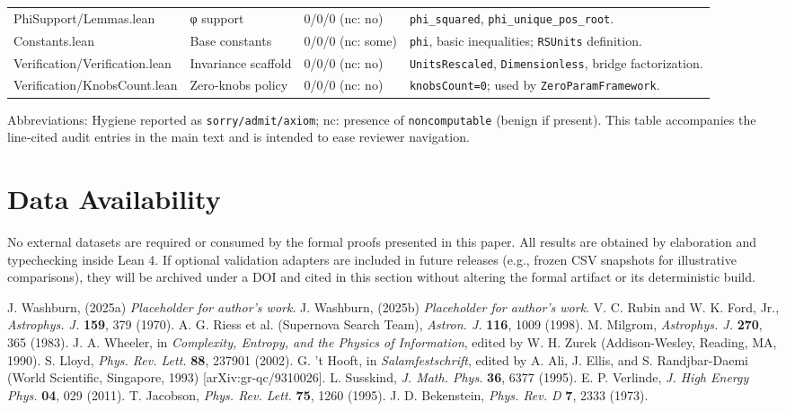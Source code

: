 \documentclass{article}
\begin{document}
\begin{center}
\begin{tabular}{lllp{6.8cm}}
PhiSupport/Lemmas.lean & φ support & 0/0/0 (nc: no) & \texttt{phi\_squared}, \texttt{phi\_unique\_pos\_root}. \\
Constants.lean & Base constants & 0/0/0 (nc: some) & \texttt{phi}, basic inequalities; \texttt{RSUnits} definition. \\
Verification/Verification.lean & Invariance scaffold & 0/0/0 (nc: no) & \texttt{UnitsRescaled}, \texttt{Dimensionless}, bridge factorization. \\
Verification/KnobsCount.lean & Zero‑knobs policy & 0/0/0 (nc: no) & \texttt{knobsCount=0}; used by \texttt{ZeroParamFramework}. \\
\hline
\end{tabular}
\end{center}

Abbreviations: Hygiene reported as \texttt{sorry/admit/axiom}; nc: presence of \texttt{noncomputable} (benign if present). This table accompanies the line‑cited audit entries in the main text and is intended to ease reviewer navigation.

\section{Data Availability}
No external datasets are required or consumed by the formal proofs presented in this paper. All results are obtained by elaboration and typechecking inside Lean 4. If optional validation adapters are included in future releases (e.g., frozen CSV snapshots for illustrative comparisons), they will be archived under a DOI and cited in this section without altering the formal artifact or its deterministic build.

\begin{thebibliography}{99}
 J. Washburn, (2025a) \textit{Placeholder for author's work}.
 J. Washburn, (2025b) \textit{Placeholder for author's work}.
 V. C. Rubin and W. K. Ford, Jr., \textit{Astrophys. J.} \textbf{159}, 379 (1970).
 A. G. Riess et al. (Supernova Search Team), \textit{Astron. J.} \textbf{116}, 1009 (1998).
 M. Milgrom, \textit{Astrophys. J.} \textbf{270}, 365 (1983).
 J. A. Wheeler, in \textit{Complexity, Entropy, and the Physics of Information}, edited by W. H. Zurek (Addison-Wesley, Reading, MA, 1990).
 S. Lloyd, \textit{Phys. Rev. Lett.} \textbf{88}, 237901 (2002).
 G. 't Hooft, in \textit{Salamfestschrift}, edited by A. Ali, J. Ellis, and S. Randjbar-Daemi (World Scientific, Singapore, 1993) [arXiv:gr-qc/9310026].
 L. Susskind, \textit{J. Math. Phys.} \textbf{36}, 6377 (1995).
 E. P. Verlinde, \textit{J. High Energy Phys.} \textbf{04}, 029 (2011).
 T. Jacobson, \textit{Phys. Rev. Lett.} \textbf{75}, 1260 (1995).
 J. D. Bekenstein, \textit{Phys. Rev. D} \textbf{7}, 2333 (1973).
\end{thebibliography}
\end{document}

